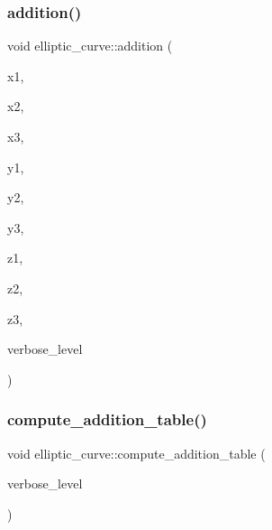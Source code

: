 \mbox{\label{classelliptic__curve_af927b0ba3e6d959598f9d372ec7315c2}} 
\subsubsection{\texorpdfstring{addition()}{addition()}}
{\footnotesize\ttfamily void elliptic\+\_\+curve\+::addition (\begin{DoxyParamCaption}\item[{\mbox{\hyperlink{galois_8h_a09fddde158a3a20bd2dcadb609de11dc}{I\+NT}}}]{x1,  }\item[{\mbox{\hyperlink{galois_8h_a09fddde158a3a20bd2dcadb609de11dc}{I\+NT}}}]{x2,  }\item[{\mbox{\hyperlink{galois_8h_a09fddde158a3a20bd2dcadb609de11dc}{I\+NT}}}]{x3,  }\item[{\mbox{\hyperlink{galois_8h_a09fddde158a3a20bd2dcadb609de11dc}{I\+NT}}}]{y1,  }\item[{\mbox{\hyperlink{galois_8h_a09fddde158a3a20bd2dcadb609de11dc}{I\+NT}}}]{y2,  }\item[{\mbox{\hyperlink{galois_8h_a09fddde158a3a20bd2dcadb609de11dc}{I\+NT}}}]{y3,  }\item[{\mbox{\hyperlink{galois_8h_a09fddde158a3a20bd2dcadb609de11dc}{I\+NT}} \&}]{z1,  }\item[{\mbox{\hyperlink{galois_8h_a09fddde158a3a20bd2dcadb609de11dc}{I\+NT}} \&}]{z2,  }\item[{\mbox{\hyperlink{galois_8h_a09fddde158a3a20bd2dcadb609de11dc}{I\+NT}} \&}]{z3,  }\item[{\mbox{\hyperlink{galois_8h_a09fddde158a3a20bd2dcadb609de11dc}{I\+NT}}}]{verbose\+\_\+level }\end{DoxyParamCaption})}

\mbox{\label{classelliptic__curve_ac5cc1cd9f3021de56372cc0a0f75b0bd}} 
\subsubsection{\texorpdfstring{compute\+\_\+addition\+\_\+table()}{compute\_addition\_table()}}
{\footnotesize\ttfamily void elliptic\+\_\+curve\+::compute\+\_\+addition\+\_\+table (\begin{DoxyParamCaption}\item[{\mbox{\hyperlink{galois_8h_a09fddde158a3a20bd2dcadb609de11dc}{I\+NT}}}]{verbose\+\_\+level }\end{DoxyParamCaption})}

